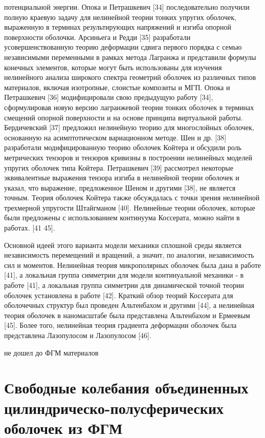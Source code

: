 потенциальной энергии. Опока и Петрашкевич [34] последовательно получили полную краевую задачу для нелинейной теории тонких упругих оболочек, выраженную в терминах результирующих напряжений и изгиба опорной поверхности оболочки. Арсиньега и Редди [35] разработали усовершенствованную теорию деформации сдвига первого порядка с семью независимыми переменными в рамках метода Лагранжа и представили формулы конечных элементов, которые могут быть использованы для изучения нелинейного анализа широкого спектра геометрий оболочек из различных типов материалов, включая изотропные, слоистые композиты и МГП. Опока и Петрашкевич [36] модифицировали свою предыдущую работу [34], сформулировав новую версию лагранжевой теории тонких оболочек в терминах смещений опорной поверхности и на основе принципа виртуальной работы. Бердичевский [37] предложил нелинейную теорию для многослойных оболочек, основанную на асимптотическом вариационном методе. Шен и др. [38] разработали модифицированную теорию оболочек Койтера и обсудили роль метрических тензоров и тензоров кривизны в построении нелинейных моделей упругих оболочек типа Койтера. Петрашкевич [39] рассмотрел некоторые эквивалентные выражения тензора изгиба в нелинейной теории оболочек и указал, что выражение, предложенное Шеном и другими [38], не является точным. Теория оболочек Койтера также обсуждалась с точки зрения нелинейной трехмерной упругости Штайгманом [40]. Нелинейные теории оболочек, которые были предложены с использованием континуума Коссерата, можно найти в работах. [41 45]. 


Основной идеей этого варианта модели механики сплошной среды является независимость перемещений и вращений, а значит, по аналогии, независимость сил и моментов. Нелинейная теория микрополярных оболочек была дана в работе [41], а локальная группа симметрии для модели континуальной механики - в работе [41], а локальная группа симметрии для динамической точной теории оболочек установлена в работе [42]. Краткий обзор теорий Коссерата для оболочечных структур был проведен Альтенбахом и другими [44], а нелинейная теория оболочек в наномасштабе была представлена Альтенбахом и Ермеевым [45]. Более того, нелинейная теория градиента деформации оболочек была представлена Лазопулосом и Лазопулосом [46].


{\color{blue} не дошел до ФГМ материалов}


\section{Свободные колебания объединенных цилиндрическо-полусферических оболочек из ФГМ} \label{ch:ch3/sec2}

